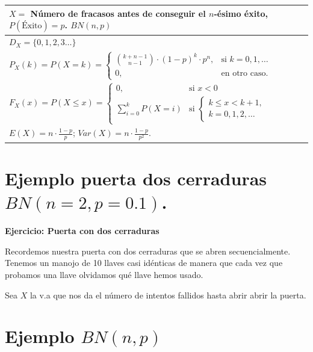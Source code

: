 \documentclass[
  letterpaper,
  DIV=11,
  numbers=noendperiod]{scrreprt}
\begin{document}
\renewcommand{\arraystretch}{1.8}
\begin{table}
\centering
\begin{tabular}{|l|}
\hline\rowcolor{LightBlue}
 $X=$ Número de fracasos antes de conseguir el $n$-ésimo éxito, $P(\mbox{Éxito})=p$. $BN(n,p)$ 
\\\hline
$D_X=\{0,1,2,3\ldots\}$  \\\hline
$P_X(k)=P(X=k)=\left\{\begin{array}{ll} {k+n-1\choose n-1} \cdot (1-p)^{k}\cdot p^n, & \mbox{si }  k=0,1,\ldots \\ 0, & \mbox{en otro caso.}\end{array}\right.$\\\hline
$
F_X(x)=P(X\leq x)=
\left\{
\begin{array}{ll} 0, & \mbox{si } x<0\\\displaystyle\sum_{i=0}^{k} P(X=i) & \mbox{si  }\left\{\begin{array}{l}k\leq x< k+1,\\k=0,1,2,\ldots\end{array}\right.\end{array}\right.$ 
\\\hline
$E(X)=n\cdot\frac{1-p}{p}$;  $Var(X)=n\cdot \frac{1-p}{p^2}.$ \\\hline
\end{tabular}
\end{table}

\section{\texorpdfstring{Ejemplo puerta dos cerraduras
\(BN(n=2,p=0.1)\).}{Ejemplo puerta dos cerraduras BN(n=2,p=0.1).}}\label{ejemplo-puerta-dos-cerraduras-bnn2p0.1.}

\textbf{Ejercicio: Puerta con dos cerraduras}

Recordemos nuestra puerta con dos cerraduras que se abren
secuencialmente. Tenemos un manojo de 10 llaves casi idénticas de manera
que cada vez que probamos una llave olvidamos qué llave hemos usado.

Sea \(X\) la v.a que nos da el número de intentos fallidos hasta abrir
abrir la puerta.

\section{\texorpdfstring{Ejemplo
\(BN(n,p)\)}{Ejemplo BN(n,p)}}\label{ejemplo-bnnp}
\end{document}
